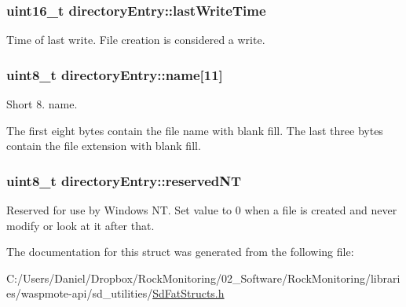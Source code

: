 \subsubsection[{\texorpdfstring{last\+Write\+Time}{lastWriteTime}}]{\setlength{\rightskip}{0pt plus 5cm}uint16\+\_\+t directory\+Entry\+::last\+Write\+Time}\hypertarget{structdirectory_entry_a7bab435322d1928f66fbce53ee1f402d}{}\label{structdirectory_entry_a7bab435322d1928f66fbce53ee1f402d}
Time of last write. File creation is considered a write. 
\subsubsection[{\texorpdfstring{name}{name}}]{\setlength{\rightskip}{0pt plus 5cm}uint8\+\_\+t directory\+Entry\+::name\mbox{[}11\mbox{]}}\hypertarget{structdirectory_entry_a05dc993ea55a1a742de5970541a31ecb}{}\label{structdirectory_entry_a05dc993ea55a1a742de5970541a31ecb}
Short 8. name.

The first eight bytes contain the file name with blank fill. The last three bytes contain the file extension with blank fill. 
\subsubsection[{\texorpdfstring{reserved\+NT}{reservedNT}}]{\setlength{\rightskip}{0pt plus 5cm}uint8\+\_\+t directory\+Entry\+::reserved\+NT}\hypertarget{structdirectory_entry_afe7d00be85f3b78549b21610050da52b}{}\label{structdirectory_entry_afe7d00be85f3b78549b21610050da52b}
Reserved for use by Windows NT. Set value to 0 when a file is created and never modify or look at it after that. 

The documentation for this struct was generated from the following file\+:\begin{DoxyCompactItemize}
\item 
C\+:/\+Users/\+Daniel/\+Dropbox/\+Rock\+Monitoring/02\+\_\+\+Software/\+Rock\+Monitoring/libraries/waspmote-\/api/sd\+\_\+utilities/\hyperlink{_sd_fat_structs_8h}{Sd\+Fat\+Structs.\+h}\end{DoxyCompactItemize}
